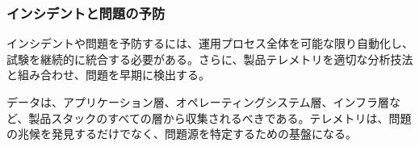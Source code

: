 \subsubsection{インシデントと問題の予防}

インシデントや問題を予防するには、運用プロセス全体を可能な限り自動化し、試験を継続的に統合する必要がある。さらに、製品テレメトリを適切な分析技法と組み合わせ、問題を早期に検出する。

データは、アプリケーション層、オペレーティングシステム層、インフラ層など、製品スタックのすべての層から収集されるべきである。テレメトリは、問題の兆候を発見するだけでなく、問題源を特定するための基盤になる。
